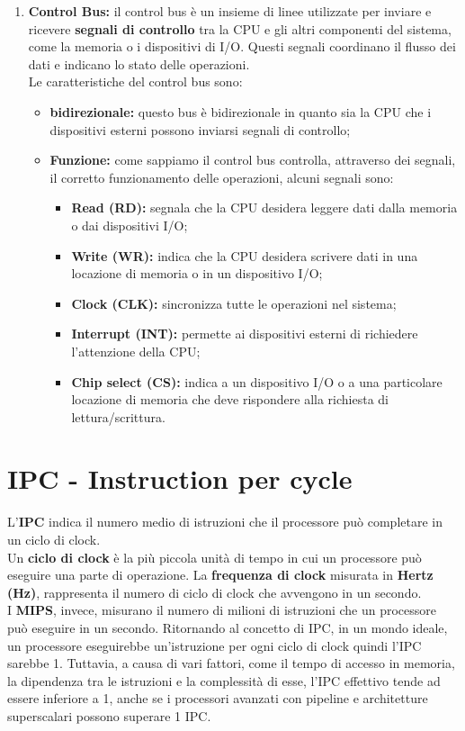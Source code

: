\documentclass[12pt]{report}
\begin{document}
\begin{enumerate}
\begin{itemize}
	\end{itemize}
	\item \textbf{Control Bus:} il control bus è un insieme di linee utilizzate per inviare e ricevere \textbf{segnali di controllo} tra la CPU e gli altri componenti del sistema, come la memoria o i dispositivi di I/O. Questi segnali coordinano il flusso dei dati e indicano lo stato delle operazioni.\\
	Le caratteristiche del control bus sono:
	\begin{itemize}
		\item \textbf{bidirezionale:} questo bus è bidirezionale in quanto sia la CPU che i dispositivi esterni possono inviarsi segnali di controllo;
		\item \textbf{Funzione:} come sappiamo il control bus controlla, attraverso dei segnali, il corretto funzionamento delle operazioni, alcuni segnali sono:
		\begin{itemize}
			\item \textbf{Read (RD):} segnala che la CPU desidera leggere dati dalla memoria o dai dispositivi I/O;
			\item \textbf{Write (WR):} indica che la CPU desidera scrivere dati in una locazione di memoria o in un dispositivo I/O;
			\item \textbf{Clock (CLK):} sincronizza tutte le operazioni nel sistema;
			\item \textbf{Interrupt (INT):} permette ai dispositivi esterni di richiedere l'attenzione della CPU;
			\item \textbf{Chip select (CS):} indica a un dispositivo I/O o a una particolare locazione di memoria che deve rispondere alla richiesta di lettura/scrittura.
		\end{itemize}
	\end{itemize}
\end{enumerate}
\section{IPC - Instruction per cycle}
L'\textbf{IPC} indica il numero medio di istruzioni che il processore può completare in un ciclo di clock. \\
Un \textbf{ciclo di clock} è la più piccola unità di tempo in cui un processore può eseguire una parte di operazione. La \textbf{frequenza di clock} misurata in \textbf{Hertz (Hz)}, rappresenta il numero di ciclo di clock che avvengono in un secondo.
\\
I \textbf{MIPS}, invece, misurano il numero di milioni di istruzioni che un processore può eseguire in un secondo.
Ritornando al concetto di IPC, in un mondo ideale, un processore eseguirebbe un'istruzione per ogni ciclo di clock quindi l'IPC sarebbe 1. Tuttavia, a causa di vari fattori, come il tempo di accesso in memoria, la dipendenza tra le istruzioni e la complessità di esse, l'IPC effettivo tende ad essere inferiore a 1, anche se i processori avanzati con pipeline e architetture superscalari possono superare 1 IPC.
\end{document}
